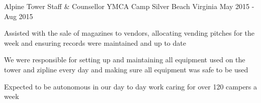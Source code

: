 \begin{cventries}
  \cventry
    {Alpine Tower Staff \& Counsellor} %
    {YMCA Camp Silver Beach} %
    {Virginia} %
    {May 2015 - Aug 2015} %
    {
      \begin{cvitems} %
        \item Assisted with the sale of magazines to vendors, allocating vending pitches for the week and ensuring records were maintained and up to date
        \item We were responsible for setting up and maintaining all equipment used on the tower and zipline every day and making sure all equipment was safe to be used
        \item Expected to be autonomous in our day to day work caring for over 120 campers a week
      \end{cvitems}
    }


\end{cventries}
